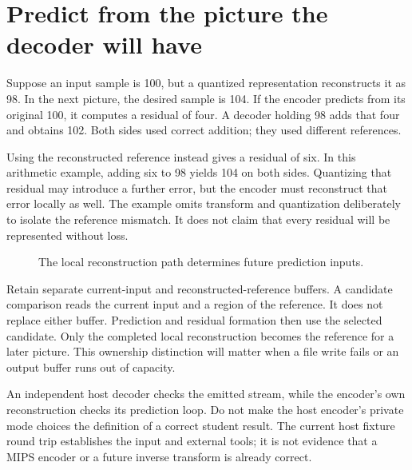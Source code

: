 \section{Predict from the picture the decoder will have}
Suppose an input sample is 100, but a quantized representation reconstructs it as
98. In the next picture, the desired sample is 104. If the encoder predicts from
its original 100, it computes a residual of four. A decoder holding 98 adds that
four and obtains 102. Both sides used correct addition; they used different
references.

Using the reconstructed reference instead gives a residual of six. In this
arithmetic example, adding six to 98 yields 104 on both sides. Quantizing that
residual may introduce a further error, but the encoder must reconstruct that
error locally as well. The example omits transform and quantization deliberately
to isolate the reference mismatch. It does not claim that every residual will
be represented without loss.

\begin{figure}[htbp]
\centering
{}
\caption{The local reconstruction path determines future prediction inputs.}
\end{figure}

Retain separate current-input and reconstructed-reference buffers. A candidate
comparison reads the current input and a region of the reference. It does not
replace either buffer. Prediction and residual formation then use the selected
candidate. Only the completed local reconstruction becomes the reference for a
later picture. This ownership distinction will matter when a file write fails
or an output buffer runs out of capacity.

An independent host decoder checks the emitted stream, while the encoder's own
reconstruction checks its prediction loop. Do not make the host encoder's private
mode choices the definition of a correct student result. The current host fixture
round trip establishes the input and external tools; it is not evidence that a
MIPS encoder or a future inverse transform is already correct.
